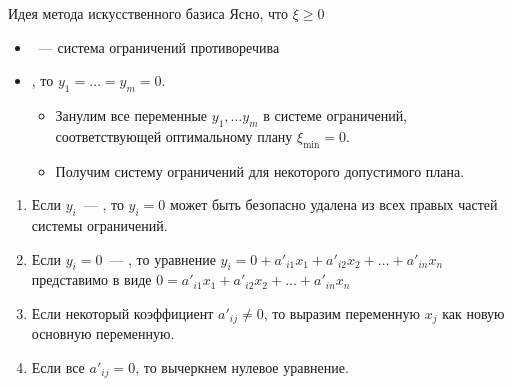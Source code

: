 \documentclass[unicode,11pt,notheorems]{beamer}
\begin{document}
\begin{frame}{Идея метода искусственного базиса}{}
Ясно, что $\xi \geqslant 0$
\begin{itemize}
\item {}~--- система ограничений противоречива

\item {}, то $y_1=\ldots=y_m=0$.

\begin{itemize}
\item 
	Занулим все переменные $y_1,\ldots y_m$ в системе ограничений, соответствующей оптимальному плану $\xi_{\min}=0$.
\item 
	Получим систему ограничений для некоторого допустимого плана.
\end{itemize}
\end{itemize}

\begin{enumerate}
\item 
	Если $y_i$~--- , то $y_i=0$ может быть безопасно удалена из всех правых частей системы ограничений.
\item 
	Если $y_i=0$~--- , то уравнение $y_i = 0 + a'_{i1} x_1 + a'_{i2} x_2 + \ldots + a'_{in} x_n $ 
	представимо в виде $0 = a'_{i1} x_1 + a'_{i2} x_2 + \ldots + a'_{in} x_n $ 
	
	\item Если некоторый коэффициент $a'_{ij} \neq 0$, то выразим переменную $x_j$ как новую основную переменную.

	\item Если все $a'_{ij}=0$, то
	вычеркнем нулевое уравнение.
\end{enumerate}

\end{frame}
\end{document}

